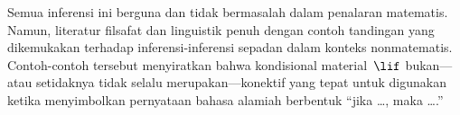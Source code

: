 \documentclass[../../../include/open-logic-section]{subfiles}
\begin{document}
Semua inferensi ini berguna dan tidak bermasalah dalam penalaran matematis.
Namun, literatur filsafat dan linguistik penuh dengan contoh tandingan yang
dikemukakan terhadap inferensi-inferensi sepadan dalam konteks
nonmatematis. Contoh-contoh tersebut menyiratkan bahwa kondisional
material~$\lif$ bukan---atau setidaknya tidak selalu merupakan---konektif
yang tepat untuk digunakan ketika menyimbolkan pernyataan bahasa alamiah
berbentuk ``jika \dots, maka \dots.''
\end{document}
